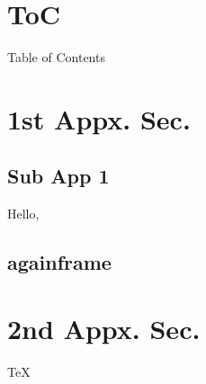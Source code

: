 \appendix



\section*{ToC}
\begin{frame}{Table of Contents}
    \tableofcontents[hideallsubsections,firstsection=3]
\end{frame}

\section[App1]{1st Appx. Sec.}
\subsection{Sub App 1}

\begin{frame}{\subsecname}
    \alert{Hello,} 
\end{frame}

\subsection{againframe}

\section[App2]{2nd Appx. Sec.}
\begin{frame}{\secname}
    \TeX
\end{frame}

